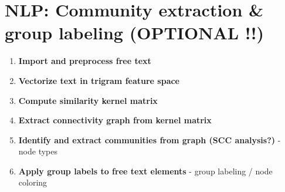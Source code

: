 \section{NLP: Community extraction \& group labeling (OPTIONAL !!)}
\label{sect:nlp_community}

	\begin{enumerate}
		\item \textbf{Import and preprocess free text}
		\item \textbf{Vectorize text in trigram feature space}
		\item \textbf{Compute similarity kernel matrix}
		\item \textbf{Extract connectivity graph from kernel matrix}
		\item \textbf{Identify and extract communities from graph (SCC analysis?)} - node types
		\item \textbf{Apply group labels to free text elements} - group labeling / node coloring
	\end{enumerate}

